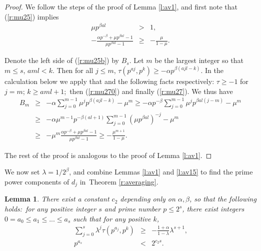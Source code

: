 \documentclass{amsart}
\newtheorem {lemma}{Lemma}
\numberwithin {equation}{section}
\begin{document}
\begin{proof}
We follow the steps of the proof of Lemma \ref{l:av1}, and first note that (\ref{r:mu25}) implies 
\begin{eqnarray}
\mu p^{\beta al}&>&1,  \label{r:mu270} \\
-\frac{\alpha p^{-\beta }+\mu p^{\beta al}-1}{\mu p^{\beta al}-1}&\geq &-\frac{\mu }{1-\mu }{\text {.}}  \label{r:mu27}
\end{eqnarray}

Denote the left side of (\ref{r:mu25b}) by $B_{s}$. Let $m$ be the largest
integer so that $m\leq s$, $aml<k$. Then for all $j\leq m$, $\tau
(p^{aj},p^{k})\geq -\alpha p^{\beta (ajl-k)}$. In the calculation below we
apply that and the following facts respectively: $\tau \geq -1$ for $j=m$; $k\geq aml+1$;\ then (\ref{r:mu270}) and finally (\ref{r:mu27}). We thus have\begin{eqnarray*}
B_{m} &\geq &-\alpha \sum_{j=0}^{m-1}\mu ^{j}p^{\beta (ajl-k)}-\mu ^{m}\geq
-\alpha p^{-\beta }\sum_{j=0}^{m-1}\mu ^{j}p^{\beta al(j-m)}-\mu ^{m} \\
&\geq &-\alpha \mu ^{m-1}p^{-\beta (al+1)}\sum_{j=0}^{m-1}(\mu p^{\beta
al})^{-j}-\mu ^{m} \\
&\geq &-\mu ^{m}\frac{\alpha p^{-\beta }+\mu p^{\beta al}-1}{\mu p^{\beta
al}-1}\geq -\frac{\mu ^{m+1}}{1-\mu }{\text{.}}
\end{eqnarray*}

The rest of the proof is analogous to the proof of Lemma \ref{l:av1}.
\end{proof}

We now set $\lambda =1/2^{\beta }$, and combine Lemmas \ref{l:av1} and \ref{l:av15} to find the prime power components of $d_{j}$ in\ Theorem \ref{r:averaging}.

\begin{lemma}
\label{l:av2}There exist a constant $c_{2}$ depending only on $\alpha ,\beta 
$, so that the following holds:\ for any positive integer $s$ and prime
number $p\leq 2^{s}$, there exist integers $0=a_{0}\leq a_{1}\leq ...\leq
a_{s}$ such that for any positive $k$, 
\begin{eqnarray}
\sum_{j=0}^{s}\lambda ^{j}\tau (p^{a_{j}},p^{k}) &\geq &-\frac{1+\alpha }{1-\lambda }\lambda ^{s+1}{\text{,}}  \label{r:hb} \\
p^{a_{s}} &<&2^{c_{2}s}.  \label{r:pmax}
\end{eqnarray}
\end{lemma}
\end{document}
